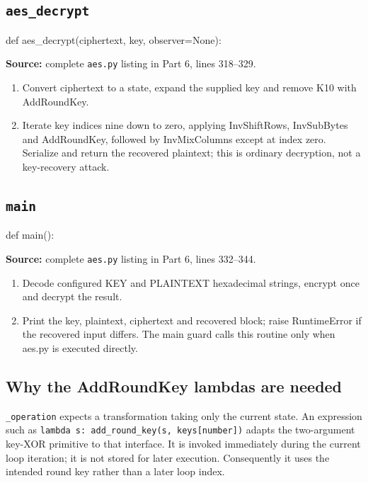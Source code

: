 \subsection{\texttt{aes\_\allowbreak{}decrypt}}
\begin{lightcode}
def aes_decrypt(ciphertext, key, observer=None):
\end{lightcode}
\noindent\textbf{Source:} complete \texttt{aes.py} listing in Part 6, lines 318--329.
\begin{enumerate}
\item Convert ciphertext to a state, expand the supplied key and remove K10 with AddRoundKey.
\item Iterate key indices nine down to zero, applying InvShiftRows, InvSubBytes and AddRoundKey, followed by InvMixColumns except at index zero. Serialize and return the recovered plaintext; this is ordinary decryption, not a key-recovery attack.
\end{enumerate}
\subsection{\texttt{main}}
\begin{lightcode}
def main():
\end{lightcode}
\noindent\textbf{Source:} complete \texttt{aes.py} listing in Part 6, lines 332--344.
\begin{enumerate}
\item Decode configured KEY and PLAINTEXT hexadecimal strings, encrypt once and decrypt the result.
\item Print the key, plaintext, ciphertext and recovered block; raise RuntimeError if the recovered input differs. The main guard calls this routine only when aes.py is executed directly.
\end{enumerate}

\subsection{Why the AddRoundKey lambdas are needed}
\texttt{\_\allowbreak{}operation} expects a transformation taking only the current state. An expression such as \texttt{lambda s: add\_\allowbreak{}round\_\allowbreak{}key(s, keys[number])} adapts the two-argument key-XOR primitive to that interface. It is invoked immediately during the current loop iteration; it is not stored for later execution. Consequently it uses the intended round key rather than a later loop index.
